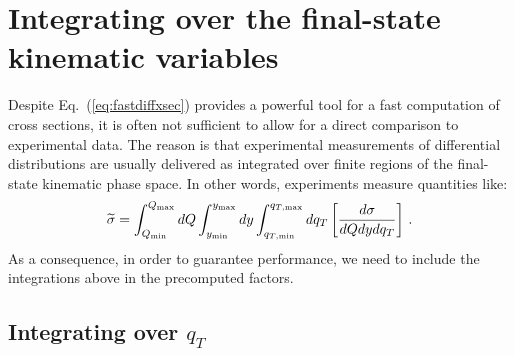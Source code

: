 \documentclass[10pt,a4paper]{article}
\begin{document}
\section{Integrating over the final-state kinematic variables}

Despite Eq.~(\ref{eq:fastdiffxsec}) provides a powerful tool for a
fast computation of cross sections, it is often not sufficient to
allow for a direct comparison to experimental data. The reason is that
experimental measurements of differential distributions are usually
delivered as integrated over finite regions of the final-state
kinematic phase space. In other words, experiments measure quantities
like:
\begin{equation}\label{eq:Intcrosssection}
\widetilde{\sigma}=\int_{Q_{\rm min}}^{Q_{\rm max}}dQ \int_{y_{\rm min}}^{y_{\rm max}}dy \int_{q_{T,\rm min}}^{q_{T,\rm max}}dq_T\left[\frac{d\sigma}{dQ dy dq_T} \right]\,.
\end{equation}
As a consequence, in order to guarantee performance, we need to
include the integrations above in the precomputed factors. 

\subsection{Integrating over $q_T$}
\end{document}
